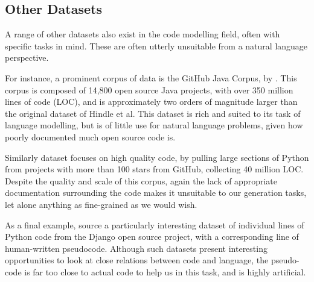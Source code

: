 \subsection{Other Datasets}
A range of other datasets also exist in the code modelling field, often with specific tasks in mind. These are often utterly unsuitable from a natural language perspective.

For instance, a prominent corpus of data is the GitHub Java Corpus, by \citet{allamanis_mining_2013}. This corpus is composed of 14,800 open source Java projects, with over 350 million lines of code (LOC), and is approximately two orders of magnitude larger than the original dataset of Hindle et al. This dataset is rich and suited to its task of language modelling, but is of little use for natural language problems, given how poorly documented much open source code is.

Similarly \citet{bhoopchand_learning_2016} dataset focuses on high quality code, by pulling large sections of Python from projects with more than 100 stars from GitHub, collecting 40 million LOC. 
Despite the quality and scale of this corpus, again the lack of appropriate documentation surrounding the code makes it unsuitable to our generation tasks, let alone anything as fine-grained as we would wish.

As a final example, \citet{y._oda_learning_2015} source a particularly interesting dataset of individual lines of Python code from the Django open source project, with a corresponding line of human-written pseudocode. Although such datasets present interesting opportunities to look at close relations between code and language, the pseudo-code is far too close to actual code to help us in this task, and is highly artificial. 






